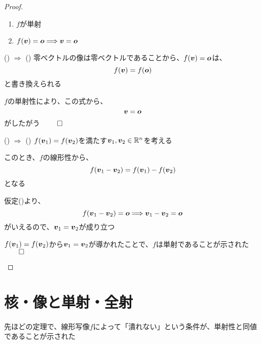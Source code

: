 \documentclass[../../../topic_linear-algebra]{subfiles}
\begin{document}
\begin{proof}
  \begin{enumerate}[label=\romanlabel]
    \item $f$が単射
    \item $f(\vb*{v}) = \vb*{o} \Longrightarrow \vb*{v} = \vb*{o}$
  \end{enumerate}

  \begin{subpattern}{() $\Longrightarrow$ ()}
    零ベクトルの像は零ベクトルであることから、$f(\vb*{v}) = \vb*{o}$は、
    \begin{equation*}
      f(\vb*{v}) = f(\vb*{o})
    \end{equation*}
    と書き換えられる

    $f$の単射性により、この式から、
    \begin{equation*}
      \vb*{v} = \vb*{o}
    \end{equation*}
    がしたがう $\qed$
  \end{subpattern}

  \begin{subpattern}{() $\Longrightarrow$ ()}
    $f(\vb*{v}_1) = f(\vb*{v}_2)$を満たす$\vb*{v}_1, \vb*{v}_2 \in \mathbb{R}^n$を考える

    このとき、$f$の線形性から、
    \begin{equation*}
      f(\vb*{v}_1 - \vb*{v}_2) = f(\vb*{v}_1) - f(\vb*{v}_2)
    \end{equation*}
    となる

    仮定()より、
    \begin{equation*}
      f(\vb*{v}_1 - \vb*{v}_2) = \vb*{o} \Longrightarrow \vb*{v}_1 - \vb*{v}_2 = \vb*{o}
    \end{equation*}
    がいえるので、$\vb*{v}_1 = \vb*{v}_2$が成り立つ

    $f(\vb*{v}_1) = f(\vb*{v}_2)$から$\vb*{v}_1 = \vb*{v}_2$が導かれたことで、$f$は単射であることが示された $\qed$
  \end{subpattern}
\end{proof}

\sectionline
\section{核・像と単射・全射}

先ほどの定理で、線形写像$f$によって「潰れない」という条件が、単射性と同値であることが示された
\end{document}
